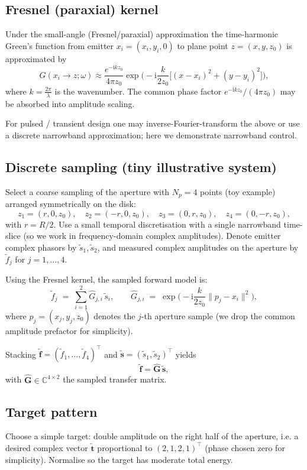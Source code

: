 \documentclass[11pt]{article}
\theoremstyle{plain}
\theoremstyle{definition}
\theoremstyle{remark}
\begin{document}
\subsection*{Fresnel (paraxial) kernel}
Under the small-angle (Fresnel/paraxial) approximation the time-harmonic Green's
function from emitter \(x_i=(x_{i},y_{i},0)\) to plane point \(z=(x,y,z_0)\) is
approximated by
\[
\hat{G}(x_i\to z;\omega) \approx \frac{e^{-\mathrm{i}k z_0}}{4\pi z_0}
\exp\!\Big(-\mathrm{i}\frac{k}{2z_0}\big[(x-x_i)^2 + (y-y_i)^2\big]\Big),
\]
where \(k=\tfrac{2\pi}{\lambda}\) is the wavenumber. The common phase factor
\(e^{-\mathrm{i}k z_0}/(4\pi z_0)\) may be absorbed into amplitude scaling.

For pulsed / transient design one may inverse-Fourier-transform the above or
use a discrete narrowband approximation; here we demonstrate narrowband control.

\subsection*{Discrete sampling (tiny illustrative system)}
Select a coarse sampling of the aperture with \(N_p=4\) points (toy example)
arranged symmetrically on the disk:
\[
z_1=(r,0,z_0),\quad z_2=(-r,0,z_0),\quad z_3=(0,r,z_0),\quad z_4=(0,-r,z_0),
\]
with \(r=R/2\). Use a small temporal discretisation with a single narrowband
time-slice (so we work in frequency-domain complex amplitudes). Denote emitter
complex phasors by \(\tilde{s}_1,\tilde{s}_2\), and measured complex amplitudes
on the aperture by \(\tilde{f}_j\) for \(j=1,\dots,4\).

Using the Fresnel kernel, the sampled forward model is:
\[
\tilde{f}_j \;=\; \sum_{i=1}^2 \hat{G}_{j,i}\,\tilde{s}_i,
\qquad
\hat{G}_{j,i} \;=\; \exp\!\Big(-\mathrm{i}\frac{k}{2z_0}\|p_j - x_i\|^2\Big),
\]
where \(p_j=(x_j,y_j, z_0)\) denotes the \(j\)-th aperture sample (we drop the common
amplitude prefactor for simplicity).

Stacking \(\tilde{\mathbf{f}}=(\tilde{f}_1,\dots,\tilde{f}_4)^\top\) and
\(\tilde{\mathbf{s}}=(\tilde{s}_1,\tilde{s}_2)^\top\) yields
\[
\tilde{\mathbf{f}} = \mathbf{\hat{G}}\,\tilde{\mathbf{s}},
\]
with \(\mathbf{\hat{G}}\in\mathbb{C}^{4\times 2}\) the sampled transfer matrix.

\subsection*{Target pattern}
Choose a simple target: double amplitude on the right half of the aperture,
i.e. a desired complex vector \(\tilde{\mathbf{t}}\) proportional to
\((2,1,2,1)^\top\) (phase chosen zero for simplicity). Normalise so the target
has moderate total energy.
\end{document}
